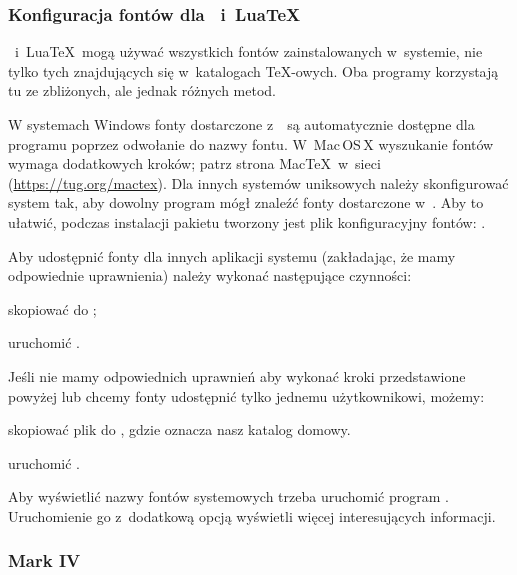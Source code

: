 \documentclass{article}
\begin{document}
\subsubsection{Konfiguracja fontów dla \protect\XeTeX\protect\ i~Lua\protect\TeX}
\label{sec:font-conf-sys}

\XeTeX\ i~Lua\TeX\ mogą używać wszystkich fontów zainstalowanych w~systemie, nie
tylko tych znajdujących się  w~katalogach \TeX-owych. Oba programy korzystają
tu ze zbliżonych, ale jednak różnych metod.

W systemach Windows fonty dostarczone z~\TL\ są automatycznie dostępne
dla programu \XeTeX{} poprzez odwołanie do nazwy fontu. W~Mac\,OS\,X{}
wyszukanie fontów wymaga dodatkowych kroków; patrz strona Mac\TeX\ w~sieci
(\url{https://tug.org/mactex}). Dla innych systemów uniksowych należy
skonfigurować system tak, aby dowolny program mógł znaleźć fonty
dostarczone w~\TL. Aby to ułatwić, podczas instalacji pakietu
 tworzony jest plik konfiguracyjny fontów:
.

Aby udostępnić fonty \TL{} dla innych aplikacji systemu
(zakładając, że mamy odpowiednie uprawnienia) należy wykonać
następujące czynności:
\begin{enumerate*}
\item skopiować  do
;
\item uruchomić .
\end{enumerate*}

Jeśli nie mamy odpowiednich uprawnień aby wykonać kroki przedstawione powyżej
lub chcemy  fonty \TL{} udostępnić tylko jednemu użytkownikowi, możemy:
\begin{enumerate*}
\item skopiować plik  do
   , gdzie \filename{~} oznacza nasz katalog domowy.
\item uruchomić .
\end{enumerate*}

Aby wyświetlić nazwy fontów systemowych trzeba uruchomić program .
Uruchomienie go z~dodatkową opcją  wyświetli
więcej interesujących informacji.


\subsubsection{\protect\ConTeXt{} Mark IV}
\label{sec:context-mkiv}
\end{document}
